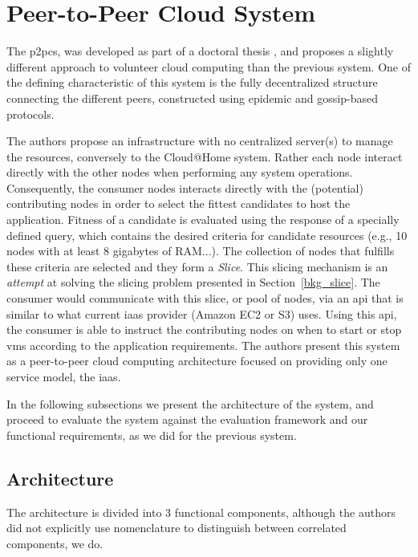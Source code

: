 \documentclass[12pt, titlepage]{uo_temp}
\begin{document}
     \section{Peer-to-Peer Cloud System}
     The \gls{p2pcs}, was developed as part of a doctoral thesis \cite{P2PCS}, and
     proposes a slightly different approach to volunteer cloud computing than the previous
     system. One of the defining characteristic of this system is the fully decentralized
     structure connecting the different peers, constructed using epidemic and gossip-based
     protocols.

     The authors propose an infrastructure with no centralized server(s) to manage the
     resources, conversely to the Cloud@Home system. Rather each node interact directly
     with the other nodes when performing any system operations. Consequently, the
     consumer nodes interacts directly with the (potential) contributing nodes in order to
     select the fittest candidates to host the application. Fitness of a candidate is
     evaluated using the response of a specially defined query, which contains the desired
     criteria for candidate resources (e.g., 10 nodes with at least 8 gigabytes of
     RAM...). The collection of nodes that fulfills these criteria are selected and they
     form a \emph{Slice}. This slicing mechanism is an \emph{attempt} at solving the
     slicing problem presented in Section~\ref{bkg_slice}. The consumer would communicate
     with this slice, or pool of nodes, via an \gls{api} that is similar to what current
     \gls{iaas} provider (Amazon EC2 or S3) uses. Using this \gls{api}, the consumer is
     able to instruct the contributing nodes on when to start or stop \gls{vm}s according
     to the application requirements. The authors present this system as a peer-to-peer
     cloud computing architecture focused on providing only one service model, the
     \gls{iaas}.
     
     In the following subsections we present the architecture of the system, and proceed
     to evaluate the system against the evaluation framework and our functional
     requirements, as we did for the previous system.

     \subsection{Architecture}
     The architecture is divided into 3 functional components, although the authors did
     not explicitly use nomenclature to distinguish between correlated components, we do. 
\end{document}
